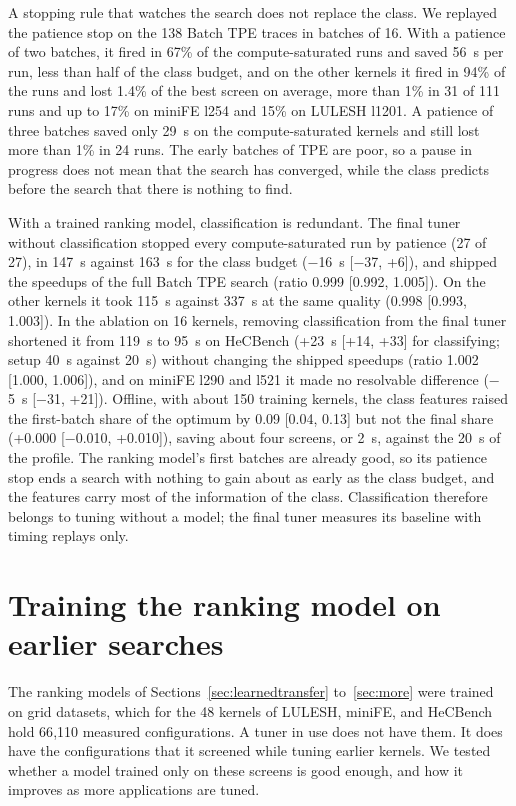 \documentclass[10pt]{article}
\begin{document}
A stopping rule that watches the search does not replace the class. We replayed
the patience stop on the 138 Batch TPE traces in batches of 16. With a patience
of two batches, it fired in 67\% of the compute-saturated runs and saved 56~s
per run, less than half of the class budget, and on the other kernels it fired
in 94\% of the runs and lost 1.4\% of the best screen on average, more than 1\%
in 31 of 111 runs and up to 17\% on miniFE l254 and 15\% on LULESH l1201. A
patience of three batches saved only 29~s on the compute-saturated kernels and
still lost more than 1\% in 24 runs. The early batches of TPE are poor, so a
pause in progress does not mean that the search has converged, while the class
predicts before the search that there is nothing to find.

With a trained ranking model, classification is redundant. The final tuner
without classification stopped every compute-saturated run by patience (27 of
27), in 147~s against 163~s for the class budget ($-$16~s [$-$37, +6]), and
shipped the speedups of the full Batch TPE search (ratio 0.999 [0.992, 1.005]).
On the other kernels it took 115~s against 337~s at the same quality (0.998
[0.993, 1.003]). In the ablation on 16 kernels, removing classification from the
final tuner shortened it from 119~s to 95~s on HeCBench (+23~s [+14, +33] for
classifying; setup 40~s against 20~s) without changing the shipped speedups
(ratio 1.002 [1.000, 1.006]), and on miniFE l290 and l521 it made no resolvable
difference ($-$5~s [$-$31, +21]). Offline, with about 150 training kernels, the
class features raised the first-batch share of the optimum by 0.09 [0.04, 0.13]
but not the final share (+0.000 [$-$0.010, +0.010]), saving about four screens,
or 2~s, against the 20~s of the profile. The ranking model's first batches are
already good, so its patience stop ends a search with nothing to gain about as
early as the class budget, and the features carry most of the information of the
class. Classification therefore belongs to tuning without a model; the final
tuner measures its baseline with timing replays only.

\section{Training the ranking model on earlier searches}
\label{sec:incremental}
The ranking models of Sections~\ref{sec:learnedtransfer} to~\ref{sec:more} were
trained on grid datasets, which for the 48 kernels of LULESH, miniFE, and
HeCBench hold 66{,}110 measured configurations. A tuner in use does not have
them. It does have the configurations that it screened while tuning earlier
kernels. We tested whether a model trained only on these screens is good enough,
and how it improves as more applications are tuned.
\end{document}
